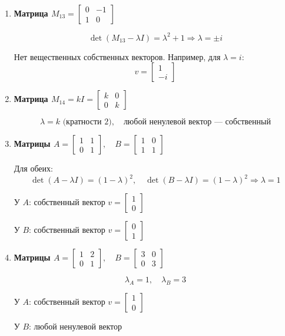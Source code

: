 \begin{enumerate}
  \item \textbf{Матрица $M_{13} = 
  \begin{bmatrix}
    0 & -1 \\
    1 & 0
  \end{bmatrix}$}

  \[
    \det(M_{13} - \lambda I) = \lambda^2 + 1 \Rightarrow \lambda = \pm i
  \]

  Нет вещественных собственных векторов. Например, для $\lambda = i$:
  \[
    v = \begin{bmatrix} 1 \\ -i \end{bmatrix}
  \]

  \item \textbf{Матрица $M_{14} = kI =
  \begin{bmatrix}
    k & 0 \\
    0 & k
  \end{bmatrix}$}

  \[
    \lambda = k \text{ (кратности 2)},\quad \text{любой ненулевой вектор — собственный}
  \]

  \item \textbf{Матрицы $A = 
  \begin{bmatrix}
    1 & 1 \\
    0 & 1
  \end{bmatrix}, \quad B = 
  \begin{bmatrix}
    1 & 0 \\
    1 & 1
  \end{bmatrix}$}

  Для обеих:
  \[
    \det(A - \lambda I) = (1 - \lambda)^2,\quad 
    \det(B - \lambda I) = (1 - \lambda)^2 \Rightarrow \lambda = 1
  \]

  У $A$: собственный вектор $v = \begin{bmatrix} 1 \\ 0 \end{bmatrix}$

  У $B$: собственный вектор $v = \begin{bmatrix} 0 \\ 1 \end{bmatrix}$

  \item \textbf{Матрицы $A = 
  \begin{bmatrix}
    1 & 2 \\
    0 & 1
  \end{bmatrix}, \quad B = 
  \begin{bmatrix}
    3 & 0 \\
    0 & 3
  \end{bmatrix}$}

  \[
    \lambda_A = 1,\quad \lambda_B = 3
  \]

  У $A$: собственный вектор $v = \begin{bmatrix} 1 \\ 0 \end{bmatrix}$

  У $B$: любой ненулевой вектор
\end{enumerate}

